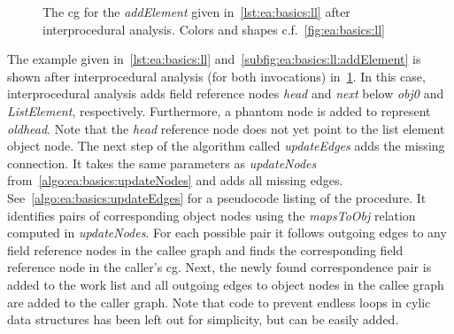 			\begin{figure}
				\centering%
				\caption[The  for \emph{addElement} after interprocedural analysis]{%
					The \acrlong{cg} for the \emph{addElement} given in~\cref{lst:ea:basics:ll} after interprocedural analysis.
					Colors and shapes c.f.~\cref{fig:ea:basics:ll}}%
				\label{fig:ea:basics:ll:inter}%
			\end{figure}

			The example given in~\cref{lst:ea:basics:ll} and~\cref{subfig:ea:basics:ll:addElement} is shown after
			interprocedural analysis (for both invocations) in~\cref{fig:ea:basics:ll:inter}. In this case, interprocedural
			analysis adds field reference nodes \emph{head} and \emph{next} below \emph{obj0} and \emph{ListElement},
			respectively. Furthermore, a phantom node is added to represent \emph{oldhead}. Note that the \emph{head}
			reference node does not yet point to the list element object node. The next step of the algorithm called
			\emph{updateEdges} adds the missing connection. It takes the same parameters as \emph{updateNodes}
			from~\cref{algo:ea:basics:updateNodes} and adds all missing edges. See~\cref{algo:ea:basics:updateEdges} for
			a pseudocode listing of the procedure. It identifies pairs of corresponding object nodes using the
			\emph{mapsToObj} relation computed in \emph{updateNodes}. For each possible pair it follows outgoing edges to any
			field reference nodes in the callee graph and finds the corresponding field reference node in the caller's
			\gls{cg}. Next, the newly found correspondence pair is added to the work list and all outgoing edges to object
			nodes in the callee graph are added to the caller graph. Note that code to prevent endless loops in cylic data
			structures has been left out for simplicity, but can be easily added.

